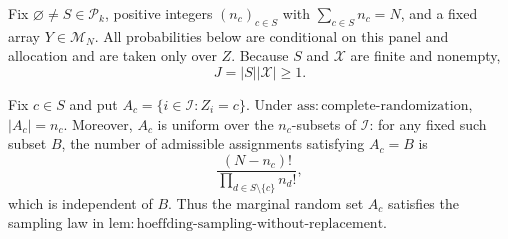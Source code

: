 Fix \(\varnothing\neq S\in\mathcal P_k\), positive integers \((n_c)_{c\in S}\) with \(\sum_{c\in S}n_c=N\), and a fixed array \(Y\in\mathcal M_N\).  All probabilities below are conditional on this panel and allocation and are taken only over \(Z\).  Because \(S\) and \(\mathcal X\) are finite and nonempty,
\[
J=|S||\mathcal X|\geq 1.
\]

Fix \(c\in S\) and put \(A_c=\{i\in\mathcal I:Z_i=c\}\).  Under \(\mathrm{ass{:}complete\text{-}randomization}\), \(|A_c|=n_c\).  Moreover, \(A_c\) is uniform over the \(n_c\)-subsets of \(\mathcal I\): for any fixed such subset \(B\), the number of admissible assignments satisfying \(A_c=B\) is
\[
\frac{(N-n_c)!}{\prod_{d\in S\setminus\{c\}}n_d!},
\]
which is independent of \(B\).  Thus the marginal random set \(A_c\) satisfies the sampling law in \(\mathrm{lem{:}hoeffding\text{-}sampling\text{-}without\text{-}replacement}\).

